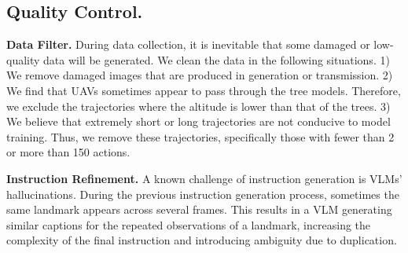 % 





    
\subsection{Quality Control.}
\textbf{Data Filter.}
During data collection, it is inevitable that some damaged or low-quality data will be generated. We clean the data in the following situations. 1) We remove damaged images that are produced in generation or transmission. 2) We find that UAVs sometimes appear to pass through the tree models. Therefore, we exclude the trajectories where the altitude is lower than that of the trees. 3) We believe that extremely short or long trajectories are not conducive to model training. Thus, we remove these trajectories, specifically those with fewer than 2 or more than 150 actions.




\textbf{Instruction Refinement.}
A known challenge of instruction generation is VLMs' hallucinations. During the previous instruction generation process, sometimes the same landmark appears across several frames. This results in a VLM generating similar captions for the repeated observations of a landmark, increasing the complexity of the final instruction and introducing ambiguity due to duplication.

